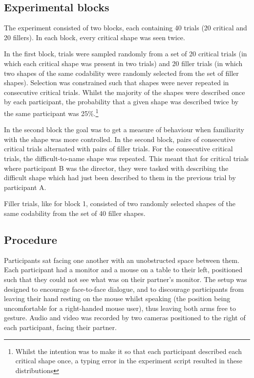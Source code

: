 \documentclass[a4paper,man,natbib]{apa6}
\begin{document}
\subsection{Experimental blocks}

The experiment consisted of two blocks, each containing 40 trials (20 critical and 20 fillers). 
In each block, every critical shape was seen twice.

In the first block, trials were sampled randomly from a set of 20 critical trials (in which each critical shape was present in two trials) and 20 filler trials (in which two shapes of the same codability were randomly selected from the set of filler shapes). 
Selection was constrained such that shapes were never repeated in consecutive critical trials.
Whilst the majority of the shapes were described once by each participant, the probability that a given shape was described twice by the same participant was 25\%.\footnote{Whilst the intention was to make it so that each participant described each critical shape once, a typing error in the experiment script resulted in these distributions} 

In the second block the goal was to get a measure of behaviour when familiarity with the shape was more controlled. 
In the second block, pairs of consecutive critical trials alternated with pairs of filler trials. 
For the consecutive critical trials, the difficult-to-name shape was repeated.
This meant that for critical trials where participant B was the director, they were tasked with describing the difficult shape which had just been described to them in the previous trial by participant A.

Filler trials, like for block 1, consisted of two randomly selected shapes of the same codability from the set of 40 filler shapes. 


\subsection{Procedure}
Participants sat facing one another with an unobstructed space between them.
Each participant had a monitor and a mouse on a table to their left, positioned such that they could not see what was on their partner's monitor.
The setup was designed to encourage face-to-face dialogue, and to discourage participants from leaving their hand resting on the mouse whilst speaking (the position being uncomfortable for a right-handed mouse user), thus leaving both arms free to gesture.
Audio and video was recorded by two cameras positioned to the right of each participant, facing their partner.
\end{document}
